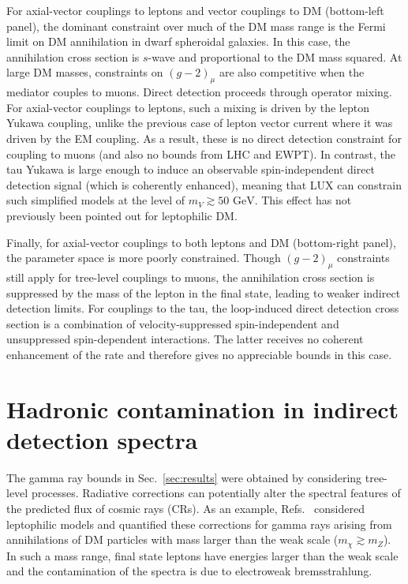 \documentclass[final,5p,twocolumn]{elsarticle}
\begin{document}
For axial-vector couplings to leptons and vector couplings to DM (bottom-left panel), the dominant constraint over much of the DM mass range is the Fermi limit on DM annihilation in dwarf spheroidal galaxies. In this case, the annihilation cross section is $s$-wave and proportional to the DM mass squared. At large DM masses, constraints on $(g-2)_\mu$ are also competitive when the mediator couples to muons. Direct detection proceeds through operator mixing. For axial-vector couplings to leptons, such a mixing is driven by the lepton Yukawa coupling, unlike the previous case of lepton vector current where it was driven by the EM coupling. As a result, these is no direct detection constraint for coupling to muons (and also no bounds from LHC and EWPT). In contrast, the tau Yukawa is large enough to induce an observable spin-independent direct detection signal (which is coherently enhanced), meaning that LUX can constrain such simplified models at the level of $m_V \gtrsim 50 \,\,\mathrm{GeV}$. This effect has not previously been pointed out for leptophilic DM.

Finally, for axial-vector couplings to both leptons and DM (bottom-right panel), the parameter space is more poorly constrained. Though $(g-2)_\mu$ constraints still apply for tree-level couplings to muons, the annihilation cross section is suppressed by the mass of the lepton in the final state, leading to weaker indirect detection limits. For couplings to the tau, the loop-induced direct detection cross section is a combination of velocity-suppressed spin-independent and unsuppressed spin-dependent interactions. The latter receives no coherent enhancement of the rate and therefore gives no appreciable bounds in this case.


\section{Hadronic contamination in indirect detection spectra}
\label{sec:contamination}

The gamma ray bounds in Sec.~\ref{sec:results} were obtained by considering tree-level processes. Radiative corrections can potentially alter the spectral features of the predicted flux of cosmic rays (CRs). As an example, Refs.~\cite{Kachelriess:2007aj,Bell:2008ey,Kachelriess:2009zy,Ciafaloni:2010qr,Ciafaloni:2010ti} considered leptophilic models and quantified these corrections for gamma rays arising from annihilations of DM particles with mass larger than the weak scale ($m_\chi \gtrsim m_{Z}$). In such a mass range, final state leptons have energies larger than the weak scale and the contamination of the spectra is due to electroweak bremsstrahlung. 
\end{document}
